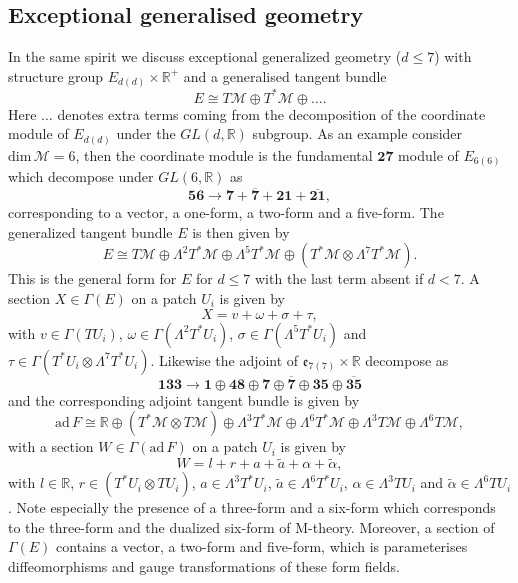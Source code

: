 \subsection{Exceptional generalised geometry}
In the same spirit we discuss exceptional generalized geometry ($d\leq 7$) with structure group $E_{d(d)}\times \mathbb{R}^+$ and a generalised tangent bundle 
\begin{equation}
    E\cong T\mathcal{M}\oplus T^*\mathcal{M}\oplus\ldots.
\end{equation}
Here $\ldots$ denotes extra terms coming from the decomposition of the coordinate module of $E_{d(d)}$ under the $GL(d,\mathbb{R})$ subgroup. As an example consider $\text{dim}\,\mathcal{M}=6$, then the coordinate module is the fundamental $\mathbf{27}$ module of $E_{6(6)}$ which decompose under $GL(6,\mathbb{R})$ as 
\begin{equation}
    \mathbf{56}\to \mathbf{7}+\overbar{\mathbf{7}}+\mathbf{21}+\overbar{\mathbf{21}},
\end{equation}
corresponding to a vector, a one-form, a two-form and a five-form. The generalized tangent bundle $E$ is then given by 
\begin{equation}
    E \cong T\mathcal{M}\oplus\Lambda^2T^*\mathcal{M}\oplus\Lambda^5T^*\mathcal{M}\oplus\left(T^*\mathcal{M}\otimes \Lambda^7T^*\mathcal{M}\right).
\end{equation}
This is the general form for $E$ for $d\leq7$ with the last term absent if $d<7$. A section $X\in\Gamma(E)$ on a patch $U_i$ is given by 
\begin{equation}
    X = v+\omega+\sigma+\tau,
\end{equation}
with $v\in\Gamma(TU_i)$, $\omega\in\Gamma(\Lambda^2T^*U_i)$, $\sigma\in\Gamma(\Lambda^5T^*U_i)$ and $\tau \in\Gamma(T^*U_i\otimes \Lambda^7T^*U_i)$.  Likewise the adjoint of $\mathfrak{e}_{7(7)}\times\mathbb{R}$ decompose as
\begin{equation}
    \mathbf{133}\to \mathbf{1}\oplus\mathbf{48}\oplus\mathbf{7}\oplus\overbar{\mathbf{7}}\oplus\mathbf{35}\oplus\overbar{\mathbf{35}}
\end{equation}
and the corresponding adjoint tangent bundle is given by
\begin{equation}
    \text{ad}\, F \cong \mathbb{R}\oplus \left(T^*\mathcal{M}\otimes T\mathcal{M}\right)\oplus \Lambda^3 T^*\mathcal{M}\oplus\Lambda^6 T^*\mathcal{M}\oplus\Lambda^3 T\mathcal{M}\oplus\Lambda^6 T\mathcal{M},
\end{equation}
with a section $W\in\Gamma(\text{ad}\,F)$ on a patch $U_i$ is given by
\begin{equation}\label{eq:AdDecompE7}
    W = l+r+a+\tilde{a}+\alpha+\tilde{\alpha},
\end{equation}
with $l\in\mathbb{R}$, $r\in (T^*U_i\otimes TU_i)$, $a\in \Lambda^3 T^*U_i$, $\tilde{a}\in \Lambda^6 T^*U_i$, $\alpha\in\Lambda^3 TU_i$ and $\tilde{\alpha}\in\Lambda^6 TU_i$. Note especially the presence of a three-form and a six-form which corresponds to the three-form and the dualized six-form of M-theory. Moreover, a section of $\Gamma(E)$ contains a vector, a two-form and five-form, which is parameterises diffeomorphisms and gauge transformations of these form fields. 

